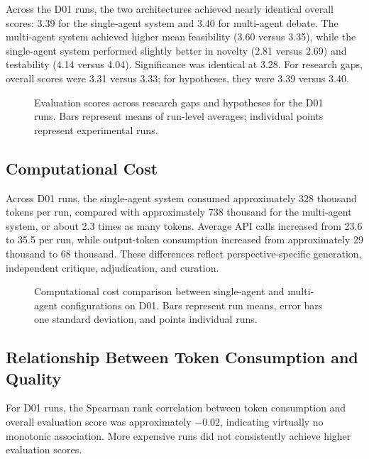 \documentclass[sigconf,review,anonymous=false]{acmart}
\begin{document}
Across the D01 runs, the two architectures achieved nearly identical overall scores: 3.39 for the single-agent system and 3.40 for multi-agent debate. The multi-agent system achieved higher mean feasibility (3.60 versus 3.35), while the single-agent system performed slightly better in novelty (2.81 versus 2.69) and testability (4.14 versus 4.04). Significance was identical at 3.28. For research gaps, overall scores were 3.31 versus 3.33; for hypotheses, they were 3.39 versus 3.40.

\begin{figure}[t]
\centering
{}
\caption{Evaluation scores across research gaps and hypotheses for the D01 runs. Bars represent means of run-level averages; individual points represent experimental runs.}
\label{fig:scores}
\end{figure}

\subsection{Computational Cost}
Across D01 runs, the single-agent system consumed approximately 328 thousand tokens per run, compared with approximately 738 thousand for the multi-agent system, or about 2.3 times as many tokens. Average API calls increased from 23.6 to 35.5 per run, while output-token consumption increased from approximately 29 thousand to 68 thousand. These differences reflect perspective-specific generation, independent critique, adjudication, and curation.

\begin{figure}[t]
\centering
{}
\caption{Computational cost comparison between single-agent and multi-agent configurations on D01. Bars represent run means, error bars one standard deviation, and points individual runs.}
\label{fig:cost}
\end{figure}

\subsection{Relationship Between Token Consumption and Quality}
For D01 runs, the Spearman rank correlation between token consumption and overall evaluation score was approximately $-0.02$, indicating virtually no monotonic association. More expensive runs did not consistently achieve higher evaluation scores.
\end{document}
